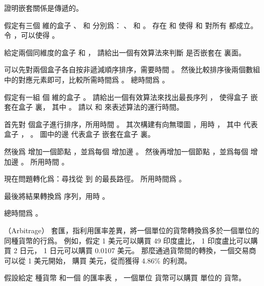 \startigBase[a]\startitem
證明嵌套關係是傳遞的。
\stopitem\stopigBase

\startANSWER
假定有三個  維的盒子 、  和  分別爲：
 、  和 。
存在  和  使得  和  對所有  都成立。
令 ，可以使得 。
\stopANSWER

\startigBase[continue]\startitem
給定兩個同維度的盒子  和 ，
請給出一個有效算法來判斷  是否嵌套在  裏面。
\stopitem\stopigBase

\startANSWER
可以先對兩個盒子各自按非遞減順序排序，需要時間 。
然後比較排序後兩個數組中的對應元素即可，比較所需時間爲 。
總時間爲 。
\stopANSWER

\startigBase[continue]\startitem
假定有一組  個  維的盒子 。
請給出一個有效算法來找出最長序列 ，
使得盒子  嵌套在盒子  裏，
其中 。
請以  和  來表述算法的運行時間。
\stopitem\stopigBase

\startANSWER
首先對  個盒子進行排序，所用時間 。
其次構建有向無環圖 ，用時 ，
其中  代表盒子 ， 。
圖中的邊  代表盒子  嵌套在盒子  裏。

然後爲  增加一個節點 ，並爲每個  增加邊 。
然後再增加一個節點 ，並爲每個  增加邊 。
所用時間 。

現在問題轉化爲：尋找從  到  的最長路徑。
所用時間爲 。

最後將結果轉換爲  序列，用時 。

總時間爲 。
\stopANSWER

\stopPROBLEM

\startPROBLEM
（Arbitrage）
{\EMP 套匯}，指利用匯率差異，將一個單位的貨幣轉換爲多於一個單位的同種貨幣的行爲。
例如，假定 1 美元可以購買 49 印度盧比， 1 印度盧比可以購買 2 日元， 1 日元可以購買 0.0107 美元。
那麼通過貨幣間的轉換，一個交易商可以從 1 美元開始，
購買  美元，從而獲得 4.86\% 的利潤。

假設給定  種貨幣  和一個  的匯率表 ，
一個單位  貨幣可以購買  單位的  貨幣。

